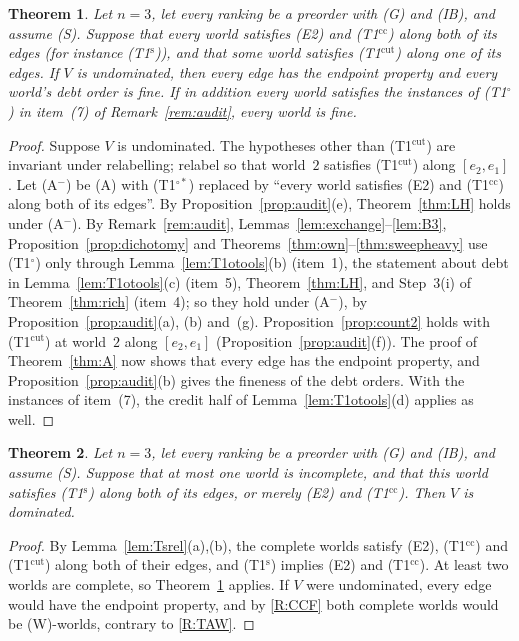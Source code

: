 \documentclass[11pt]{article}
\newtheorem{theorem}{Theorem}
\theoremstyle{definition}\newtheorem{definition}[theorem]{Definition}
\theoremstyle{remark}\newtheorem{remark}[theorem]{Remark}
\newcommand{\To}{\textup{(T1$^\circ$)}}
\newcommand{\Tos}{\textup{(T1$^{\circ*}$)}}
\newcommand{\Ts}{\textup{(T1$^{\mathrm s}$)}}
\newcommand{\Tcc}{\textup{(T1$^{\mathrm{cc}}$)}}
\newcommand{\Tcut}{\textup{(T1$^{\mathrm{cut}}$)}}
\begin{document}
\begin{theorem}\label{thm:Astar}
Let $n=3$, let every ranking be a preorder with (G) and (IB), and assume
(S). Suppose that every world satisfies (E2) and \Tcc{} along both of its
edges (for instance \Ts), and that some world satisfies \Tcut{} along one of
its edges. If $V$ is undominated, then every edge has the endpoint property
and every world's debt order is fine. If in addition every world satisfies
the instances of \To{} in item~(7) of Remark~\ref{rem:audit}, every world
is fine.
\end{theorem}
\begin{proof}
Suppose $V$ is undominated. The hypotheses other than \Tcut{} are invariant
under relabelling; relabel so that world~$2$ satisfies \Tcut{} along
$[e_2,e_1]$. Let (A$^-$) be (A) with \Tos{} replaced by ``every world
satisfies (E2) and \Tcc{} along both of its edges''. By
Proposition~\ref{prop:audit}(e), Theorem~\ref{thm:LH} holds under (A$^-$).
By Remark~\ref{rem:audit}, Lemmas~\ref{lem:exchange}--\ref{lem:B3},
Proposition~\ref{prop:dichotomy} and
Theorems~\ref{thm:own}--\ref{thm:sweepheavy} use \To{} only through
Lemma~\ref{lem:T1otools}(b) (item~1), the statement about debt in
Lemma~\ref{lem:T1otools}(c) (item~5), Theorem~\ref{thm:LH}, and Step~3(i)
of Theorem~\ref{thm:rich} (item~4); so they hold under (A$^-$), by
Proposition~\ref{prop:audit}(a), (b) and~(g). Proposition~\ref{prop:count2} holds
with \Tcut{} at world~$2$ along $[e_2,e_1]$
(Proposition~\ref{prop:audit}(f)). The proof of Theorem~\ref{thm:A} now
shows that every edge has the endpoint property, and
Proposition~\ref{prop:audit}(b) gives the fineness of the debt orders. With
the instances of item~(7), the credit half of Lemma~\ref{lem:T1otools}(d)
applies as well.
\end{proof}

\begin{theorem}\label{thm:Bstar}
Let $n=3$, let every ranking be a preorder with (G) and (IB), and assume
(S). Suppose that at most one world is incomplete, and that this world
satisfies \Ts{} along both of its edges, or merely (E2) and \Tcc. Then $V$
is dominated.
\end{theorem}
\begin{proof}
By Lemma~\ref{lem:Tsrel}(a),(b), the complete worlds satisfy (E2), \Tcc{}
and \Tcut{} along both of their edges, and \Ts{} implies (E2) and \Tcc{}.
At least two worlds are complete, so Theorem~\ref{thm:Astar} applies. If
$V$ were undominated, every edge would have the endpoint property, and by
\ref{R:CCF} both complete worlds would be (W)-worlds, contrary to
\ref{R:TAW}.
\end{proof}
\end{document}

